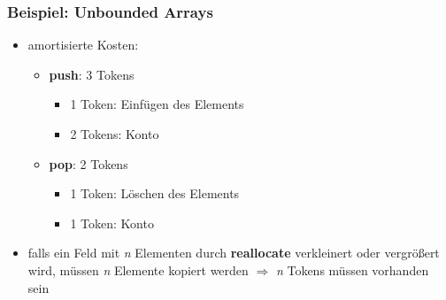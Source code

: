 \begin{frame}
	\frametitle{Beispiel: Unbounded Arrays}

	\begin{itemize}
		\item amortisierte Kosten:
		\begin{itemize}
			\item \textbf{push}: 3 Tokens
			\begin{itemize}
				\item 1 Token: Einfügen des Elements
				\item 2 Tokens: Konto
			\end{itemize}
			\item \textbf{pop}: 2 Tokens
			\begin{itemize}
				\item 1 Token: Löschen des Elements
				\item 1 Token: Konto
			\end{itemize}
		\end{itemize}
		\item falls ein Feld mit \textit{n} Elementen durch \textbf{reallocate} verkleinert oder vergrößert wird,
		 müssen \textit{n} Elemente kopiert werden $\Rightarrow$ \textit{n} Tokens müssen vorhanden sein

	\end{itemize}

\end{frame}

